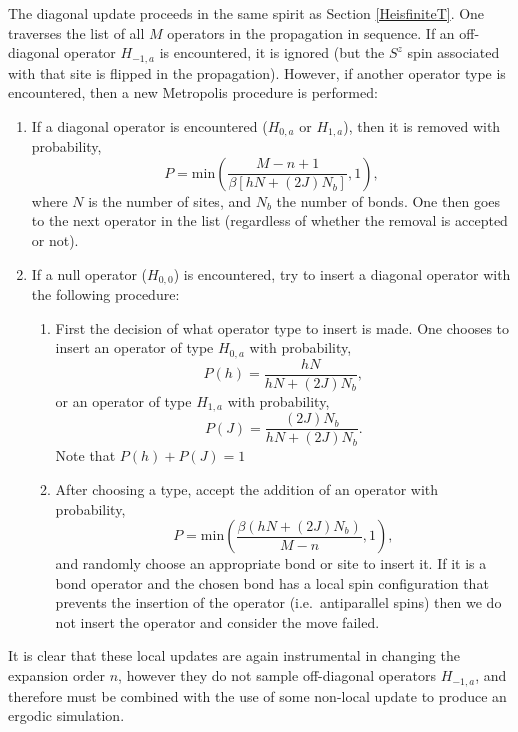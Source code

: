 \documentclass[vecphys]{svmult}
\begin{document}
The diagonal update proceeds in the same spirit as Section \ref{HeisfiniteT}.  One traverses the list of all $M$ operators in the propagation in sequence. If an off-diagonal operator $H_{-1,a}$ is encountered, it is ignored (but the $S^z$ spin associated with that site is flipped in the propagation).  However, if another operator type is encountered, then a new Metropolis procedure is performed:
\begin{enumerate}
\item If a diagonal operator is encountered ($H_{0,a}$ or $H_{1,a}$), then it is removed with probability,
\begin{equation}
P = \mathrm{min}\left( \frac{M-n+1}{\beta[hN + (2J)N_b]},1\right),
\end{equation}
where $N$ is the number of sites, and $N_b$ the number of bonds.  
One then goes to the next operator in the list (regardless of whether the removal is accepted or not).
\item If a null operator ($H_{0,0}$) is encountered,  try to insert a diagonal operator with the following procedure:
\begin{enumerate}
\item First the decision of what operator type to insert is made.  One chooses to insert an operator of type $H_{0,a}$ with probability,
\begin{equation}
P(h) = \frac{h N}{hN + (2J)N_b},
\end{equation}
or an operator of type $H_{1,a}$ with probability,
\begin{equation}
P(J) = \frac{(2J)N_b}{hN + (2J)N_b} .
\end{equation}
Note that $P(h) + P(J) = 1$
\item After choosing a type, accept the addition of an operator with probability,
\begin{equation}
P = \mathrm{min}\left(\frac{\beta(hN + (2J)N_b)}{M-n},1\right),
\end{equation}
and randomly choose an appropriate bond or site to insert it.
If it is a bond operator and the chosen bond has a local spin configuration that prevents the insertion of the operator (i.e.~antiparallel spins) then we do not insert the operator and consider the move failed.
\end{enumerate}
\end{enumerate}
It is clear that these local updates are again instrumental in changing the expansion order $n$, however they do not sample off-diagonal operators $H_{-1,a}$, and therefore must be combined with the use of some non-local update to produce an ergodic simulation.
\end{document}
